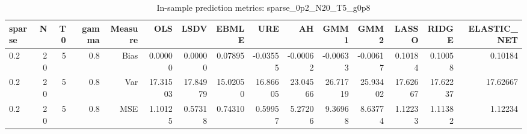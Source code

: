 \begin{table}[!htbp]\centering
\caption{In-sample prediction metrics: sparse_0p2_N20_T5_g0p8}
\label{tab:table2_sparse_0p2_N20_T5_g0p8}
\begin{tabular}{lrrrrrrrrrrrrrr}
\hline
sparse & N & T0 & gamma & Measure & OLS & LSDV & EBMLE & URE & AH & GMM1 & GMM2 & LASSO & RIDGE & ELASTIC_NET \\
\hline
0.2 & 20 & 5 & 0.8 & Bias & 0.00000 & 0.00000 & 0.07895 & -0.03555 & -0.00062 & -0.00633 & -0.00617 & 0.10184 & 0.10058 & 0.10184 \\
0.2 & 20 & 5 & 0.8 & Var & 17.31503 & 17.84979 & 15.02050 & 16.86605 & 23.04566 & 26.71719 & 25.93402 & 17.62667 & 17.62237 & 17.62667 \\
0.2 & 20 & 5 & 0.8 & MSE & 1.10125 & 0.57318 & 0.74310 & 0.59957 & 5.27206 & 9.36968 & 8.63774 & 1.12233 & 1.11382 & 1.12234 \\
\hline
\end{tabular}
\end{table}

